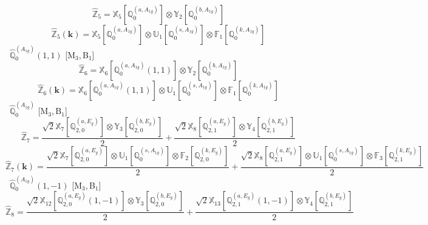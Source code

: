 \documentclass[fleqn,10pt,landscape]{article}
\begin{document}
\begin{itemize}
\begin{dmath*}
\hat{\mathbb{Z}}_{5}=\mathbb{X}_{5}[\mathbb{Q}_{0}^{(a,A_{1g})}] \otimes\mathbb{Y}_{2}[\mathbb{Q}_{0}^{(b,A_{1g})}]
\end{dmath*}
\begin{dmath*}
\hat{\mathbb{Z}}_{5}(\bm{k})=\mathbb{X}_{5}[\mathbb{Q}_{0}^{(a,A_{1g})}] \otimes\mathbb{U}_{1}[\mathbb{Q}_{0}^{(s,A_{1g})}] \otimes\mathbb{F}_{1}[\mathbb{Q}_{0}^{(k,A_{1g})}]
\end{dmath*}
\vspace{4mm}
\noindent {} $\,\,\,\hat{\mathbb{Q}}_{0}^{(A_{1g})}(1,1)$ [M$_{3}$,\,B$_{1}$]
\begin{dmath*}
\hat{\mathbb{Z}}_{6}=\mathbb{X}_{6}[\mathbb{Q}_{0}^{(a,A_{1g})}(1,1)] \otimes\mathbb{Y}_{2}[\mathbb{Q}_{0}^{(b,A_{1g})}]
\end{dmath*}
\begin{dmath*}
\hat{\mathbb{Z}}_{6}(\bm{k})=\mathbb{X}_{6}[\mathbb{Q}_{0}^{(a,A_{1g})}(1,1)] \otimes\mathbb{U}_{1}[\mathbb{Q}_{0}^{(s,A_{1g})}] \otimes\mathbb{F}_{1}[\mathbb{Q}_{0}^{(k,A_{1g})}]
\end{dmath*}
\vspace{4mm}
\noindent {} $\,\,\,\hat{\mathbb{Q}}_{0}^{(A_{1g})}$ [M$_{3}$,\,B$_{1}$]
\begin{dmath*}
\hat{\mathbb{Z}}_{7}=\frac{\sqrt{2} \mathbb{X}_{7}[\mathbb{Q}_{2,0}^{(a,E_{g})}] \otimes\mathbb{Y}_{3}[\mathbb{Q}_{2,0}^{(b,E_{g})}]}{2} + \frac{\sqrt{2} \mathbb{X}_{8}[\mathbb{Q}_{2,1}^{(a,E_{g})}] \otimes\mathbb{Y}_{4}[\mathbb{Q}_{2,1}^{(b,E_{g})}]}{2}
\end{dmath*}
\begin{dmath*}
\hat{\mathbb{Z}}_{7}(\bm{k})=\frac{\sqrt{2} \mathbb{X}_{7}[\mathbb{Q}_{2,0}^{(a,E_{g})}] \otimes\mathbb{U}_{1}[\mathbb{Q}_{0}^{(s,A_{1g})}] \otimes\mathbb{F}_{2}[\mathbb{Q}_{2,0}^{(k,E_{g})}]}{2} + \frac{\sqrt{2} \mathbb{X}_{8}[\mathbb{Q}_{2,1}^{(a,E_{g})}] \otimes\mathbb{U}_{1}[\mathbb{Q}_{0}^{(s,A_{1g})}] \otimes\mathbb{F}_{3}[\mathbb{Q}_{2,1}^{(k,E_{g})}]}{2}
\end{dmath*}
\vspace{4mm}
\noindent {} $\,\,\,\hat{\mathbb{Q}}_{0}^{(A_{1g})}(1,-1)$ [M$_{3}$,\,B$_{1}$]
\begin{dmath*}
\hat{\mathbb{Z}}_{8}=\frac{\sqrt{2} \mathbb{X}_{12}[\mathbb{Q}_{2,0}^{(a,E_{g})}(1,-1)] \otimes\mathbb{Y}_{3}[\mathbb{Q}_{2,0}^{(b,E_{g})}]}{2} + \frac{\sqrt{2} \mathbb{X}_{13}[\mathbb{Q}_{2,1}^{(a,E_{g})}(1,-1)] \otimes\mathbb{Y}_{4}[\mathbb{Q}_{2,1}^{(b,E_{g})}]}{2}
\end{dmath*}

\end{itemize}
\end{document}
